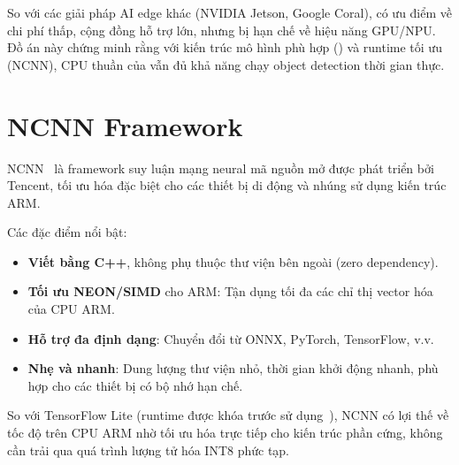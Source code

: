 So với các giải pháp AI edge khác (NVIDIA Jetson, Google Coral), \rpi có ưu điểm về chi phí thấp, cộng đồng hỗ trợ lớn, nhưng bị hạn chế về hiệu năng GPU/NPU. Đồ án này chứng minh rằng với kiến trúc mô hình phù hợp (\yolo) và runtime tối ưu (NCNN), CPU thuần của \rpi vẫn đủ khả năng chạy object detection thời gian thực.

\section{NCNN Framework}
\label{sec:bg_ncnn}

NCNN~\cite{ncnn} là framework suy luận mạng neural mã nguồn mở được phát triển bởi Tencent, tối ưu hóa đặc biệt cho các thiết bị di động và nhúng sử dụng kiến trúc ARM.

Các đặc điểm nổi bật:
\begin{itemize}
    \item \textbf{Viết bằng C++}, không phụ thuộc thư viện bên ngoài (zero dependency).
    \item \textbf{Tối ưu NEON/SIMD} cho ARM: Tận dụng tối đa các chỉ thị vector hóa của CPU ARM.
    \item \textbf{Hỗ trợ đa định dạng}: Chuyển đổi từ ONNX, PyTorch, TensorFlow, v.v.
    \item \textbf{Nhẹ và nhanh}: Dung lượng thư viện nhỏ, thời gian khởi động nhanh, phù hợp cho các thiết bị có bộ nhớ hạn chế.
\end{itemize}

So với TensorFlow Lite (runtime được khóa trước sử dụng~\cite{kltn_tiennhiem}), NCNN có lợi thế về tốc độ trên CPU ARM nhờ tối ưu hóa trực tiếp cho kiến trúc phần cứng, không cần trải qua quá trình lượng tử hóa INT8 phức tạp.
